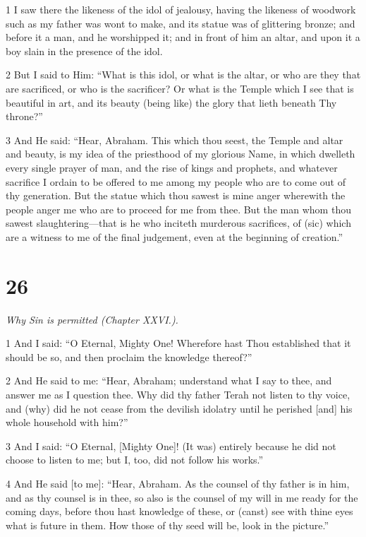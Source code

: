 \par 1 I saw there the likeness of the idol of jealousy, having the likeness of woodwork such as my father was wont to make, and its statue was of glittering bronze; and before it a man, and he worshipped it; and in front of him an altar, and upon it a boy slain in the presence of the idol.

\par 2 But I said to Him: “What is this idol, or what is the altar, or who are they that are sacrificed, or who is the sacrificer? Or what is the Temple which I see that is beautiful in art, and its beauty (being like) the glory that lieth beneath Thy throne?”

\par 3 And He said: “Hear, Abraham. This which thou seest, the Temple and altar and beauty, is my idea of the priesthood of my glorious Name, in which dwelleth every single prayer of man, and the rise of kings and prophets, and whatever sacrifice I ordain to be offered to me among my people who are to come out of thy generation. But the statue which thou sawest is mine anger wherewith the people anger me who are to proceed for me from thee. But the man whom thou sawest slaughtering—that is he who inciteth murderous sacrifices, of (sic) which are a witness to me of the final judgement, even at the beginning of creation.”

\chapter{26}

\par \textit{Why Sin is permitted (Chapter XXVI.).}

\par 1 And I said: “O Eternal, Mighty One! Wherefore hast Thou established that it should be so, and then proclaim the knowledge thereof?”

\par 2 And He said to me: “Hear, Abraham; understand what I say to thee, and answer me as I question thee. Why did thy father Terah not listen to thy voice, and (why) did he not cease from the devilish idolatry until he perished [and] his whole household with him?”

\par 3 And I said: “O Eternal, [Mighty One]! (It was) entirely because he did not choose to listen to me; but I, too, did not follow his works.”

\par 4 And He said [to me]: “Hear, Abraham. As the counsel of thy father is in him, and as thy counsel is in thee, so also is the counsel of my will in me ready for the coming days, before thou hast knowledge of these, or (canst) see with thine eyes what is future in them. How those of thy seed will be, look in the picture.”

